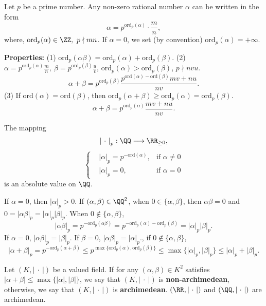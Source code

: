 \begin{exampleenv}
    Let $p$ be a prime number. Any non-zero rational number $\alpha$ can be written in the form
    $$\alpha=p^{\mathrm{ord}_p(\alpha)}\cdot\frac{m}{n},$$
    where, $\mathrm{ord}_p(\alpha)\in \ZZ,\ p\nmid mn$. If $\alpha=0$, we set (by convention) $\mathrm{ord}_p(\alpha)=+\infty.$

    \textbf{Properties:} 
    \newline
    (1) $\mathrm{ord}_p(\alpha\beta)=\mathrm{ord}_p(\alpha)+\mathrm{ord}_p(\beta)$.
    \newline
    (2) $\alpha=p^{\mathrm{ord}_p(\alpha)}\frac{m}{n},\ \beta=p^{\mathrm{ord}_p(\beta)}\frac{u}{v}$, $\mathrm{ord}_p(\alpha)>\mathrm{ord}_p(\beta)$, $p\nmid nvu$.
    $$\alpha+\beta=p^{\mathrm{ord}_p(\beta)}\frac{p^{\mathrm{ord}(\alpha)-\mathrm{ord}(\beta)}mv+nu}{nv}.$$
    (3) If $\mathrm{ord}(\alpha)=\mathrm{ord}(\beta)$, then $\mathrm{ord}_{p}(\alpha+\beta)\ge \mathrm{ord}_p(\alpha)=\mathrm{ord}_p(\beta).$
    $$\alpha+\beta=p^{\mathrm{ord}_p(\alpha)}\frac{mv+nu}{nv}.$$
\end{exampleenv}
\begin{propositionenv}
    The mapping 
    $$\left|\ \cdot\ \right|_{p}: \QQ\longrightarrow \RR_{\ge 0},$$
    $$\left\{\begin{matrix}
        &|\alpha|_p=p^{-\mathrm{ord}(\alpha)}, &\text{if } \alpha\neq0\\
        &|\alpha|_p=0, &\text{if } \alpha=0
    \end{matrix}\right.$$
    is an absolute value on $\QQ$.
\end{propositionenv}
\begin{proofenv}
    If $\alpha=0$, then $|\alpha|_p>0$. If $(\alpha,\beta)\in \QQ^2$, when $0\in \{\alpha,\beta\}$, then $\alpha\beta=0$ and $0=|\alpha\beta|_p=|\alpha|_p|\beta|_p$. When $0\notin\{\alpha,\beta\}$, 
    $$|\alpha\beta|_p=p^{-\mathrm{ord}_p(\alpha\beta)}=p^{-\mathrm{ord}_p(\alpha)-\mathrm{ord}_p(\beta)}= |\alpha|_p|\beta|_p.$$
    If $\alpha=0$, $|\alpha\beta|_p= |\beta|_p.$ If $\beta=0$, $|\alpha\beta|_p= |\alpha|_p.$, if $0\notin\{\alpha,\beta\}$,
    $$|\alpha+\beta|_p=p^{-\mathrm{ord}_p(\alpha+\beta)}\le p^{\max\{\mathrm{ord}_p(\alpha),\mathrm{ord}_p(\beta)\}}\le \max\{|\alpha|_p,|\beta|_p\}\le |\alpha|_p+|\beta|_p.$$
\end{proofenv}
\begin{remark}
    Let $(K,\left|\ \cdot\ \right|)$ be a valued field. If for any $(\alpha,\beta)\in K^2$ satisfies $|\alpha+\beta|\le \max\{|\alpha|,|\beta|\}$, we say that $(K,\left|\ \cdot\ \right|)$ is \textbf{non-archimedean}, otherwise, we say that $(K,\left|\ \cdot\ \right|)$ is \textbf{archimedean}. $(\RR,\left|\ \cdot\ \right|)$ and $(\QQ,\left|\ \cdot\ \right|)$ are archimedean.
\end{remark}
